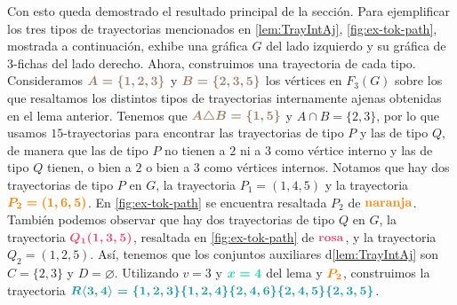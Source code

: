 Con esto queda demostrado el resultado principal de la secci\'on. Para
ejemplificar los tres tipos de trayectorias mencionados en \cref{lem:TrayIntAj},
\cref{fig:ex-tok-path}, mostrada a continuaci\'on, exhibe una gr\'afica $G$ del
lado izquierdo y su gr\'afica de $3$-fichas del lado derecho. Ahora, construimos
una trayectoria de cada tipo. Consideramos ${\color{baige}\boldsymbol {A=
\{1,2,3\}}}$ y ${\color{baige}\boldsymbol {B=\{2,3,5\}}}$ los v\'ertices en
$F_3(G)$ sobre los que resaltamos los distintos tipos de trayectorias
internamente ajenas obtenidas en el lema anterior. Tenemos que ${\color{baige}
\boldsymbol {A\triangle B=\{1,5\}}}$ y $A\cap B=\{2,3\}$, por lo que usamos
$15$-trayectorias para encontrar las trayectorias de tipo $P$ y las de tipo $Q$,
de manera que las de tipo $P$ no tienen a $2$ ni a $3$ como v\'ertice interno y
las de tipo $Q$ tienen, o bien a $2$ o bien a $3$ como v\'ertices internos.
Notamos que hay dos trayectorias de tipo $P$ en $G$, la trayectoria
$P_1=(1,4,5)$ y la trayectoria ${\color{naranja}\boldsymbol {P_2=(1,6,5)}}$. En
\cref{fig:ex-tok-path} se encuentra resaltada $P_2$ de ${\color{naranja} \bf
naranja}$. Tambi\'en podemos observar que hay dos trayectorias de tipo $Q$ en
$G$, la trayectoria ${\color{fushia}\boldsymbol {Q_1(1,3,5)}}$, resaltada en
\cref{fig:ex-tok-path} de ${\color{fushia}\bf rosa}$, y la trayectoria
$Q_2=(1,2,5)$. As\'i, tenemos que los conjuntos auxiliares d\cref{lem:TrayIntAj}
son $C=\{2,3\}$ y $D= \varnothing$. Utilizando $v=3$ y
${\color{menta}\boldsymbol {x=4}}$ del lema y ${\color{naranja}\boldsymbol
{P_2}}$, construimos la trayectoria $ {\color{verdeAzulado}\boldsymbol {R\langle
3, 4 \rangle =\{1,2,3\}\{1,2,4\} \{2,4,6\}\{2,4,5\}\{2,3,5\}}}$.


